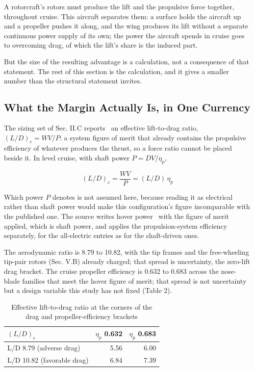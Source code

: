 \documentclass[journal]{new-aiaa}
\begin{document}
A rotorcraft's rotors must produce the lift and the propulsive force together, throughout cruise. This aircraft separates them: a surface holds the aircraft up and a propeller pushes it along, and the wing produces its lift without a separate continuous power supply of its own; the power the aircraft spends in cruise goes to overcoming drag, of which the lift's share is the induced part.

But the size of the resulting advantage is a calculation, not a consequence of that statement. The rest of this section is the calculation, and it gives a smaller number than the structural statement invites.

\subsection{What the Margin Actually Is, in One Currency}

The sizing set of Sec. II.C reports~\cite{r16} an effective lift-to-drag ratio, $(L/D)_e = WV/P$: a system figure of merit that already contains the propulsive efficiency of whatever produces the thrust, so a force ratio cannot be placed beside it. In level cruise, with shaft power $P = DV/\eta_p$,

\begin{equation}
(L/D)_e = \frac{WV}{P} = (L/D)\,\eta_p
\end{equation}

Which power $P$ denotes is not assumed here, because reading it as electrical rather than shaft power would make this configuration's figure incomparable with the published one. The source writes hover power~\cite{r16} with the figure of merit applied, which is shaft power, and applies the propulsion-system efficiency separately, for the all-electric entries as for the shaft-driven ones.

The aerodynamic ratio is 8.79 to 10.82, with the tip frames and the free-wheeling tip-pair rotors (Sec. V.B) already charged; that spread is uncertainty, the zero-lift drag bracket. The cruise propeller efficiency is 0.632 to 0.683 across the nose-blade families that meet the hover figure of merit; that spread is not uncertainty but a design variable this study has not fixed (Table 2).

\begin{table}[htbp]
\centering
\caption{Effective lift-to-drag ratio at the corners of the drag and propeller-efficiency brackets}
\label{tab:2}
\small
\begin{tabularx}{\linewidth}{lrr}
\hline
$(L/D)_e$ & $\eta_p$ 0.632 & $\eta_p$ 0.683 \\ \hline
L/D 8.79 (adverse drag) & 5.56 & 6.00 \\
L/D 10.82 (favorable drag) & 6.84 & 7.39 \\
\hline
\end{tabularx}
\end{table}
\end{document}
